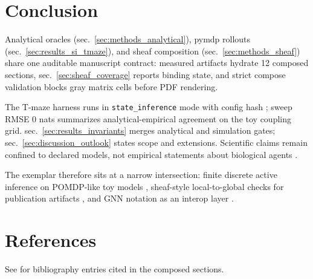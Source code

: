 \documentclass[
  english,
]{article}
\begin{document}
\newpage

\section{Conclusion}\label{sec:conclusion}

Analytical oracles (sec.~\ref{sec:methods_analytical}), pymdp rollouts
(sec.~\ref{sec:results_si_tmaze}), and sheaf composition
(sec.~\ref{sec:methods_sheaf}) share one auditable manuscript contract:
measured artifacts hydrate 12 composed sections,
sec.~\ref{sec:sheaf_coverage} reports binding state, and strict compose
validation blocks gray matrix cells before PDF rendering.

The T-maze harness runs in \texttt{state\_inference} mode with config
hash ; sweep RMSE 0 nats summarizes
analytical-empirical agreement on the toy coupling grid.
sec.~\ref{sec:results_invariants} merges analytical and simulation
gates; sec.~\ref{sec:discussion_outlook} states scope and extensions.
Scientific claims remain confined to declared models, not empirical
statements about biological agents \citep{gershman2019fepbrain}.

The exemplar therefore sits at a narrow intersection: finite discrete
active inference on POMDP-like toy models
\citep{dacosta2020discrete, friston2021sophisticated, dacosta2023reward},
sheaf-style local-to-global checks for publication artifacts
\citep{curry2014sheaves, robinson2014topological}, and GNN notation as
an interop layer \citep{gnn2023}.

\newpage

\section{References}\label{references}

See  for bibliography entries cited in
the composed sections.

\newpage



\providecommand{\bibsection}{}
\renewcommand{\bibsection}{}
\end{document}
